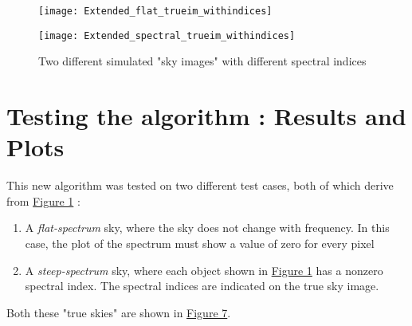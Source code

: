 \documentclass{article}
\begin{document}
\begin{figure}
\begin{minipage}[b]{.5\textwidth}
\texttt{[image: Extended\_flat\_trueim\_withindices]}
\end{minipage}%
\begin{minipage}[b]{.5\linewidth}
\texttt{[image: Extended\_spectral\_trueim\_withindices]}
\end{minipage}
\caption{Two different simulated "sky images" with different spectral indices}
\label{ 8}
\end{figure}
\section{Testing the algorithm : Results and Plots}
This new algorithm was tested on two different test cases, both of which derive from \hyperref[ 1]{Figure 1} : \label{section3}
\begin{enumerate}
\item A \textit{flat-spectrum} sky, where the sky does not change with frequency. In this case, the plot of the spectrum must show a value of zero for every pixel
\item A \textit{steep-spectrum} sky, where each object shown in \hyperref[ 1]{Figure 1} has a nonzero spectral index. The spectral indices are indicated on the true sky image.
\end{enumerate}
Both these "true skies" are shown in \hyperref[ 7]{Figure 7}.
\end{document}
